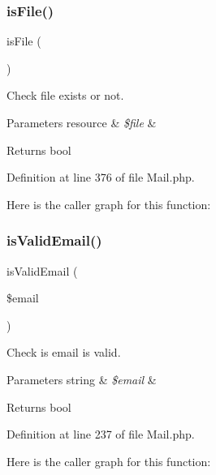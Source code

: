 \subsubsection{\texorpdfstring{is\+File()}{isFile()}}
{\footnotesize\ttfamily is\+File (\begin{DoxyParamCaption}{ }\end{DoxyParamCaption})}

Check file exists or not.


\begin{DoxyParams}[1]{Parameters}
resource & {\em \$file} & \\
\hline
\end{DoxyParams}
\begin{DoxyReturn}{Returns}
bool 
\end{DoxyReturn}


Definition at line 376 of file Mail.\+php.

Here is the caller graph for this function\+:
\mbox{\label{class_zest_1_1_mail_1_1_mail_ae48b4d105b2d71bd9c3f88fdf3666058}} 
\subsubsection{\texorpdfstring{is\+Valid\+Email()}{isValidEmail()}}
{\footnotesize\ttfamily is\+Valid\+Email (\begin{DoxyParamCaption}\item[{}]{\$email }\end{DoxyParamCaption})}

Check is email is valid.


\begin{DoxyParams}[1]{Parameters}
string & {\em \$email} & \\
\hline
\end{DoxyParams}
\begin{DoxyReturn}{Returns}
bool 
\end{DoxyReturn}


Definition at line 237 of file Mail.\+php.

Here is the caller graph for this function\+:
\mbox{\label{class_zest_1_1_mail_1_1_mail_af2eba74758819578cec6df5de4a8daf6}} 
